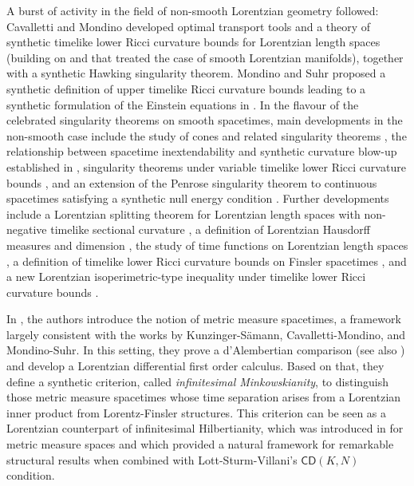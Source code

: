 \documentclass[a4paper,10pt]{article}
\numberwithin{equation}{section}
\newcommand{\cd}{\mathsf{CD}}
\begin{document}
A burst of activity in the field of non-smooth Lorentzian geometry followed: 
Cavalletti and Mondino \cite{cavalletti2020optimal} developed optimal transport tools and a theory of synthetic timelike lower Ricci curvature bounds  for Lorentzian length spaces (building on \cite{mccann2018displacement} and \cite{mondino2022optimal} that treated the case of smooth Lorentzian manifolds), together with a synthetic Hawking singularity theorem. Mondino and Suhr proposed a synthetic definition of upper timelike Ricci curvature bounds leading to a synthetic formulation of the Einstein equations in \cite{mondino2022optimal}.
In the flavour of the celebrated singularity theorems on smooth spacetimes, main developments in the non-smooth case include the study of cones and related singularity theorems \cite{alexander2019generalized}, the relationship between spacetime inextendability and synthetic curvature blow-up established in \cite{grant2019inextendibility}, singularity theorems under variable timelike lower Ricci curvature bounds \cite{BM-MEMS}, and an extension of the Penrose singularity theorem to continuous spacetimes satisfying a synthetic null energy condition \cite{CMM-Synthetic-2025}.
Further developments include a Lorentzian splitting theorem  for Lorentzian length spaces with non-negative timelike sectional curvature \cite{beran2023splitting}, a definition of Lorentzian Hausdorff measures and dimension \cite{mccann2022lorentzian}, the study of time functions on Lorentzian length spaces \cite{burtscher2025time}, a definition of timelike lower Ricci curvature bounds on Finsler spacetimes \cite{braun2024optimal}, and a new Lorentzian isoperimetric-type inequality under timelike lower Ricci curvature bounds \cite{CM:LorentzianIsop}.

In \cite{beran2024nonlinear}, the authors introduce the notion of  metric measure spacetimes, a framework largely consistent with the works by Kunzinger-Sämann, Cavalletti-Mondino, and Mondino-Suhr. In this setting, they  prove a d'Alembertian comparison (see also \cite{braun2024exact}) and develop a Lorentzian differential first order calculus.   
Based on that, they define a synthetic criterion, called \emph{infinitesimal Minkowskianity}, to distinguish those metric measure spacetimes whose time separation arises from a Lorentzian inner product from Lorentz-Finsler structures.  This criterion  can be seen as a Lorentzian counterpart of infinitesimal Hilbertianity, which was introduced in \cite{AGS14, gigli2015differential} for metric measure spaces and which provided a natural framework  for remarkable structural results \cite{MN-JEMS2019, BS-CPAM2020} when combined with Lott-Sturm-Villani's $\cd(K,N)$ condition.
\end{document}

